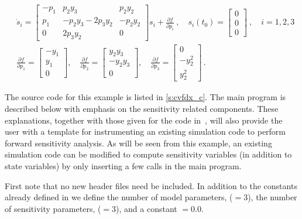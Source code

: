\begin{equation}\label{e:cvfdx_sens}
  \begin{split}
    & {\dot s}_i = 
    \begin{bmatrix}
      - p_1 &   p_2 y_3             &   p_2 y_2 \\
        p_1 & - p_2 y_3 - 2 p_3 y_2 & - p_2 y_2 \\
        0   &             2 p_3 y_2 &  0              
    \end{bmatrix}
    s_i + \frac{\partial f}{\partial p_i} ~,
    \quad s_i(t_0) = \begin{bmatrix} 0 \\ 0 \\ 0 \end{bmatrix}  ~,
    \quad i = 1,2,3 \\
    & \frac{\partial f}{\partial p_1} = \begin{bmatrix} -y_1 \\ y_1 \\ 0 \end{bmatrix}, \quad
    \frac{\partial f}{\partial p_2} = \begin{bmatrix} y_2 y_3 \\ -y_2 y_3 \\ 0 \end{bmatrix}, \quad
    \frac{\partial f}{\partial p_3} = \begin{bmatrix} 0 \\ - y_2^2 \\ y_2^2 \end{bmatrix} \, .
  \end{split}
\end{equation}

The source code for this example is listed in \A\ref{s:cvfdx_c}. The main program is described 
below with emphasis on the sensitivity related components. 
These explanations, together with those given for the code 
in~\cite{cvode2.2.0_ex}, will also provide the user with a template for instrumenting 
an existing simulation code to perform forward sensitivity analysis.
As will be seen from this example, an existing simulation code can be modified to compute 
sensitivity variables (in addition to state variables) by only inserting a few {\cvodes} 
calls in the main program. 

First note that no new header files need be included. In addition to the constants already
defined in  we define the number of model parameters,  ($=3$),
the number of sensitivity parameters,  ($=3$), and a constant $=0.0$. 

